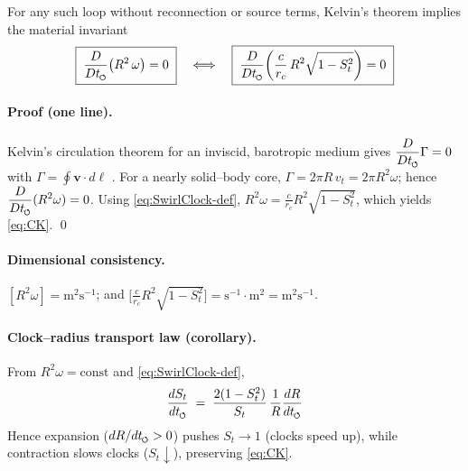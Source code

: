 \documentclass[11pt]{article}
\begin{document}
    \begin{theorem}
        For any such loop without reconnection or source terms, Kelvin’s theorem implies the
        material invariant
        \begin{equation}
            \boxed{\;
            \frac{D}{Dt_{\swirlarrow}}\!\left(R^2\,\omega\right)=0
            \;}
            \quad\Longleftrightarrow\quad
            \boxed{\;
            \frac{D}{Dt_{\swirlarrow}}\!\left(
                                    \frac{c}{r_c}\,R^2 \sqrt{1-S_t^2}
            \right)=0
            \;}
            \label{eq:CK}
        \end{equation}
    \end{theorem}

    \paragraph{Proof (one line).}
    Kelvin’s circulation theorem for an inviscid, barotropic medium gives
    $\displaystyle \frac{D}{Dt_{\swirlarrow}}\Gamma=0$ with $\Gamma=\oint \mathbf{v}\cdot d\boldsymbol{\ell}$ \cite{Helmholtz1858,Kelvin1869,Batchelor1967}.
    For a nearly solid–body core, $\Gamma=2\pi R\, v_t=2\pi R^2 \omega$; hence
    $\displaystyle \frac{D}{Dt_{\swirlarrow}}(R^2\omega)=0$.
    Using \eqref{eq:SwirlClock-def}, $R^2\omega=\tfrac{c}{r_c} R^2\sqrt{1-S_t^2}$, which yields \eqref{eq:CK}. \qed

    \paragraph{Dimensional consistency.}
    $[R^2\omega]=\text{m}^2\text{s}^{-1}$; and
    $\big[\tfrac{c}{r_c}R^2\sqrt{1-S_t^2}\big]=\text{s}^{-1}\cdot\text{m}^2=\text{m}^2\text{s}^{-1}$.

    \paragraph{Clock–radius transport law (corollary).}
    From $R^2\omega=\text{const}$ and \eqref{eq:SwirlClock-def},
    \begin{equation}
        \frac{dS_t}{dt_{\swirlarrow}} \;=\; \frac{2(1-S_t^2)}{S_t}\,\frac{1}{R}\frac{dR}{dt_{\swirlarrow}}
        \label{eq:clock-radius-ode}
    \end{equation}
    Hence expansion ($dR/dt_{\swirlarrow}>0$) pushes $S_t\!\to\!1$ (clocks speed up), while contraction
    slows clocks ($S_t\!\downarrow$), preserving \eqref{eq:CK}.
\end{document}

